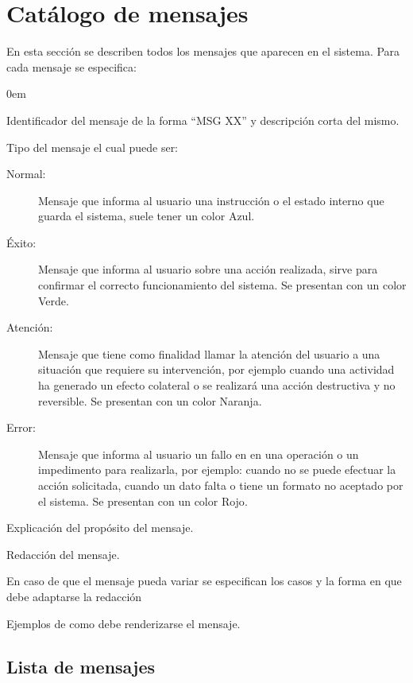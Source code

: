 \section{Catálogo de mensajes}	
\label{sec:mensajes}

En esta sección se describen todos los mensajes que aparecen en el sistema. Para cada mensaje se especifica:

\begin{description}\itemsep0em
	\item[Id:] Identificador del mensaje de la forma ``MSG XX'' y descripción corta del mismo.
	\item[Tipo:] Tipo del mensaje el cual puede ser: 
	\begin{description}
		\item[Normal:] Mensaje que informa al usuario una instrucción o el estado interno que guarda el sistema, suele tener un color {\color{msgNormalColor}Azul}.
		\item[Éxito:] Mensaje que informa al usuario sobre una acción realizada, sirve para confirmar el correcto funcionamiento del sistema. Se presentan con un color {\color{msgInfoColor}Verde}.
		\item[Atención:] Mensaje que tiene como finalidad llamar la atención del usuario a una situación que requiere su intervención, por ejemplo cuando una actividad ha generado un efecto colateral o se realizará una acción destructiva y no reversible. Se presentan con un color {\color{msgWarningColor}Naranja}.
		\item[Error:] Mensaje que informa al usuario un fallo en en una operación o un impedimento para realizarla, por ejemplo: cuando no se puede efectuar la acción solicitada, cuando un dato falta o tiene un formato no aceptado por el sistema. Se presentan con un color {\color{msgErrorColor}Rojo}.
	\end{description}
	\item[Propósito:] Explicación del propósito del mensaje.
	\item[Redacción:] Redacción del mensaje.
	\item[Parámetros:] En caso de que el mensaje pueda variar se especifican los casos y la forma en que debe adaptarse la redacción
	\item[Ejemplos:] Ejemplos de como debe renderizarse el mensaje.
\end{description}


\subsection{Lista de mensajes}

